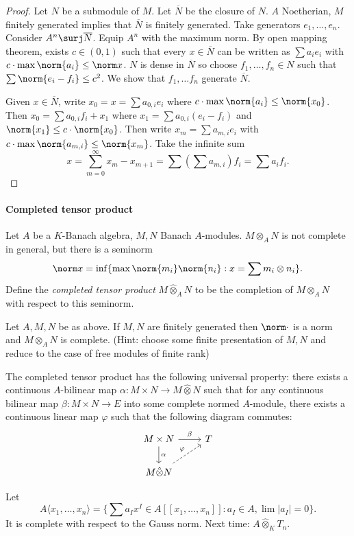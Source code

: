 \documentclass[a4paper]{article}
\begin{document}
\begin{proof}
  Let \(N\) be a submodule of \(M\). Let \(\overline N\) be the closure of \(N\). \(A\) Noetherian, \(M\) finitely generated implies that \(\overline N\) is finitely generated. Take generators \(e_1, \dots, e_n\). Consider \(A^n \surj \overline N\). Equip \(A^n\) with the maximum norm. By open mapping theorem, exists \(c \in (0, 1)\) such that every \(x \in \overline N\) can be written as \(\sum a_i e_i\) with \(c \cdot \max \norm{a_i} \leq \norm x\). \(N\) is dense in \(\overline N\) so choose \(f_1, \dots, f_n \in N\) such that \(\sum \norm{e_i - f_i} \leq c^2\). We show that \(f_1, \dots f_n\) generate \(\overline N\).

  Given \(x \in \overline N\), write \(x_0 = x = \sum a_{0, i} e_i\) where \(c \cdot \max \norm{a_i} \leq \norm{x_0}\). Then \(x_0 = \sum a_{0, i} f_i + x_1\) where \(x_1 = \sum a_{0, i}(e_i - f_i)\) and \(\norm {x_1} \leq c \cdot \norm{x_0}\). Then write \(x_m = \sum a_{m, i} e_i\) with \(c \cdot \max \norm{a_{m, i}} \leq \norm{x_m}\). Take the infinite sum
  \[
    x = \sum_{m = 0}^\infty x_m - x_{m + 1} = \sum (\sum a_{m, i})f_i = \sum a_i f_i.
  \]
\end{proof}

\paragraph{Completed tensor product}

Let \(A\) be a \(K\)-Banach algebra, \(M, N\) Banach \(A\)-modules. \(M \otimes_A N\) is not complete in general, but there is a seminorm
\[
  \norm x = \inf\{\max \norm{m_i} \norm{n_i}: x = \sum m_i \otimes n_i\}.
\]
Define the \emph{completed tensor product} \(M \hat \otimes_A N\) to be the completion of \(M \otimes_A N\) with respect to this seminorm.

\begin{ex}
  Let \(A, M, N\) be as above. If \(M, N\) are finitely generated then \(\norm \cdot\) is a norm and \(M \otimes_A N\) is complete. (Hint: choose some finite presentation of \(M, N\) and reduce to the case of free modules of finite rank)
\end{ex}

The completed tensor product has the following universal property: there exists a continuous \(A\)-bilinear map \(\alpha: M \times N \to M \hat \otimes N\) such that for any continuous bilinear map \(\beta: M \times N \to E\) into some complete normed \(A\)-module, there exists a continuous linear map \(\varphi\) such that the following diagram commutes:
\[
  \begin{tikzcd}
    M \times N \ar[d, "\alpha"] \ar[r, "\beta"] & T \\
    M \hat \otimes N \ar[ur, "\varphi", dashed]
  \end{tikzcd}
\]

\begin{eg}
  Let
  \[
    A \langle x_1, \dots, x_n \rangle = \{ \sum a_I x^I \in A[[x_1, \dots, x_n]]: a_I \in A, \lim |a_I| = 0 \}.
  \]
  It is complete with respect to the Gauss norm. Next time: \(A \hat \otimes_K T_n\).
\end{eg}






\printindex
\end{document}
